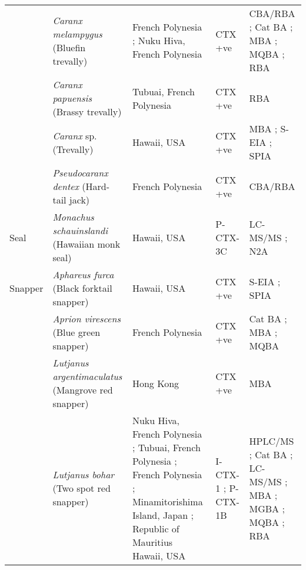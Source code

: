 \documentclass[12pt]{article}
\begin{document}
\begin{longtable}{  | p{2cm} | p{3cm} | p{4.5cm}  | p{2cm} | p{3cm}  | }
  & \emph{Caranx melampygus} (Bluefin trevally) & French Polynesia \cite{bagnis1987use,chinain2014mail}; Nuku Hiva, French Polynesia \cite{darius2007ciguatera} & CTX +ve \cite{bagnis1987use,darius2007ciguatera,chinain2014mail} & CBA/RBA \cite{chinain2014mail}; Cat BA \cite{bagnis1987use}; MBA \cite{bagnis1987use}; MQBA \cite{bagnis1987use}; RBA \cite{darius2007ciguatera} \\
  &  \emph{Caranx papuensis} (Brassy trevally) & Tubuai, French Polynesia \cite{darius2007ciguatera} & CTX +ve \cite{darius2007ciguatera} & RBA \cite{darius2007ciguatera} \\
  & \emph{Caranx} sp. (Trevally)  & Hawaii, USA \cite{hokama1993evaluation,hokama1990simplified} & CTX +ve \cite{hokama1990simplified,hokama1993evaluation} & MBA \cite{hokama1993evaluation}; S-EIA \cite{hokama1993evaluation,hokama1990simplified}; SPIA \cite{hokama1990simplified,hokama1993evaluation} \\
    & \emph{Pseudocaranx dentex} (Hard-tail jack) & French Polynesia \cite{chinain2014mail} & CTX +ve \cite{chinain2014mail} & CBA/RBA \cite{chinain2014mail} \\
  \hline
 Seal & \emph{Monachus schauinslandi} (Hawaiian monk seal) & Hawaii, USA \cite{bottein2011identification} & P-CTX-3C \cite{bottein2011identification}  & LC-MS/MS \cite{bottein2011identification}; N2A \cite{bottein2011identification}  \\
 \hline
 Snapper &  \emph{Aphareus furca} (Black forktail snapper) & Hawaii, USA \cite{hokama1990simplified} & CTX +ve \cite{hokama1990simplified} & S-EIA \cite{hokama1990simplified}; SPIA \cite{hokama1990simplified}  \\
  & \emph{Aprion virescens} (Blue green snapper) & French Polynesia \cite{bagnis1987use} &  CTX +ve \cite{bagnis1987use} & Cat BA \cite{bagnis1987use}; MBA \cite{bagnis1987use}; MQBA \cite{bagnis1987use} \\
  & \emph{Lutjanus argentimaculatus} (Mangrove red snapper) & Hong Kong \cite{wong2008features} & CTX +ve \cite{wong2008features}  & MBA \cite{wong2008features} \\
  &  \emph{Lutjanus bohar} (Two spot red snapper) & Nuku Hiva, French Polynesia \cite{darius2007ciguatera}; Tubuai, French Polynesia \cite{darius2007ciguatera}; French Polynesia \cite{bagnis1987use}; Minamitorishima Island, Japan \cite{yogi2011detailed}; Republic of Mauritius \cite{hamilton2002multiple,hamilton2002isolation} Hawaii, USA \cite{hokama1990simplified} & I-CTX-1 \cite{hamilton2002multiple,hamilton2002isolation}; P-CTX-1B \cite{yogi2011detailed} & HPLC/MS \cite{hamilton2002multiple,hamilton2002isolation}; Cat BA \cite{bagnis1987use}; LC-MS/MS \cite{yogi2011detailed}; MBA \cite{hamilton2002multiple,bagnis1987use,hamilton2002isolation}; MGBA \cite{hamilton2002multiple,hamilton2002isolation}; MQBA \cite{bagnis1987use}; RBA  \cite{darius2007ciguatera} \\

\end{longtable}
\end{document}
